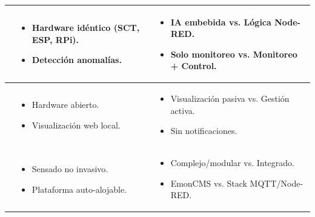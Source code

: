 \begin{table}[H]
{\begin{tabular}{>{\centering\arraybackslash}p{2cm} p{5.5cm} p{5.5cm}}
        \cite{AguirreNunez2019} & 
        \begin{itemize}[leftmargin=*, topsep=0pt, itemsep=0pt, parsep=0pt, partopsep=0pt]
            \item Hardware idéntico (SCT, ESP, RPi).
            \item Detección anomalías.
        \end{itemize} & 
        \begin{itemize}[leftmargin=*, topsep=0pt, itemsep=0pt, parsep=0pt, partopsep=0pt]
            \item IA embebida vs. Lógica Node-RED.
            \item Solo monitoreo vs. Monitoreo + Control.
        \end{itemize} \\
        \midrule

        \cite{Cicutti2019} & 
        \begin{itemize}[leftmargin=*, topsep=0pt, itemsep=0pt, parsep=0pt, partopsep=0pt]
            \item Hardware abierto.
            \item Visualización web local.
        \end{itemize} & 
        \begin{itemize}[leftmargin=*, topsep=0pt, itemsep=0pt, parsep=0pt, partopsep=0pt]
            \item Visualización pasiva vs. Gestión activa.
            \item Sin notificaciones.
        \end{itemize} \\
        \midrule

        \cite{openenergymonitor} & 
        \begin{itemize}[leftmargin=*, topsep=0pt, itemsep=0pt, parsep=0pt, partopsep=0pt]
            \item Sensado no invasivo.
            \item Plataforma auto-alojable.
        \end{itemize} & 
        \begin{itemize}[leftmargin=*, topsep=0pt, itemsep=0pt, parsep=0pt, partopsep=0pt]
            \item Complejo/modular vs. Integrado.
            \item EmonCMS vs. Stack MQTT/Node-RED.
        \end{itemize} \\

        \bottomrule
        \end{tabular}
        }
    \end{table}
\newpage
    
